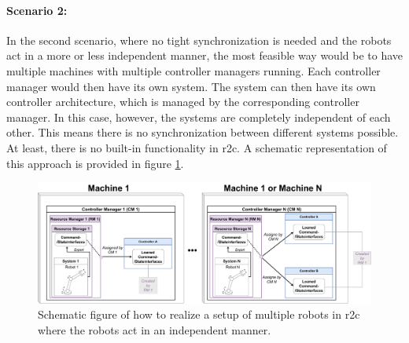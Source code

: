 \paragraph{Scenario 2:} 
In the second scenario, where no tight synchronization is needed and the robots act in a more or less independent manner, the most feasible way would be to have multiple machines with multiple controller managers running. Each controller manager would then have its own system. The system can then have its own controller architecture, which is managed by the corresponding controller manager. \newline
In this case, however, the systems are completely independent of each other. This means there is no synchronization between different systems possible. At least, there is no built-in functionality in \gls{r2c}. A schematic representation of this approach is provided in figure \ref{c3_fig_r2c_mr_is}.
\begin{figure}[htbp]
	\centering
	\includegraphics[width=1\textwidth]{Figures/c3/multiple_independent_robots_current.pdf}
	\caption{Schematic figure of how to realize a setup of multiple robots in \gls{r2c} where the robots act in an independent manner.}
	\label{c3_fig_r2c_mr_is}
\end{figure}






